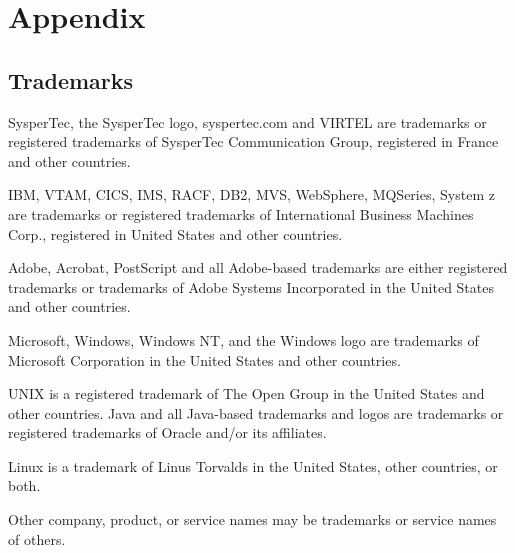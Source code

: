 \documentclass[letterpaper,10pt,english]{sphinxmanual}
\begin{document}
\section{Appendix}
\label{\detokenize{User_Guide:appendix}}

\subsection{Trademarks}
\label{\detokenize{User_Guide:trademarks}}
SysperTec, the SysperTec logo, syspertec.com and VIRTEL are trademarks or registered trademarks of SysperTec
Communication Group, registered in France and other countries.

IBM, VTAM, CICS, IMS, RACF, DB2, MVS, WebSphere, MQSeries, System z are trademarks or registered trademarks of
International Business Machines Corp., registered in United States and other countries.

Adobe, Acrobat, PostScript and all Adobe-based trademarks are either registered trademarks or trademarks of Adobe
Systems Incorporated in the United States and other countries.

Microsoft, Windows, Windows NT, and the Windows logo are trademarks of Microsoft Corporation in the United States
and other countries.

UNIX is a registered trademark of The Open Group in the United States and other countries.
Java and all Java-based trademarks and logos are trademarks or registered trademarks of Oracle and/or its affiliates.

Linux is a trademark of Linus Torvalds in the United States, other countries, or both.

Other company, product, or service names may be trademarks or service names of others.
\end{document}

